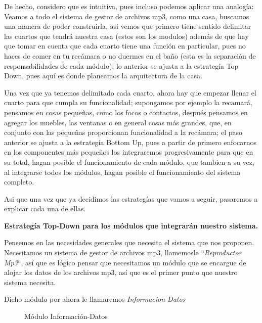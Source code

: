 \documentclass[10pt,letterpaper]{report}
\begin{document}
\noindent De hecho, considero que es intuitiva, pues incluso podemos aplicar una analogía: Veamos a todo el sistema de gestor de archivos mp3, como una casa, buscamos una manera de poder construirla, asi vemos que primero tiene sentido delimitar las cuartos que tendrá nuestra casa (estos son los modulos) además de que hay que tomar en cuenta que cada cuarto tiene una función en particular, pues no haces de comer en tu recámara o no duermes en el baño (esta es la separación de responsabilidades de cada módulo); lo anterior se ajusta a la estrategía Top Down, pues aquí es donde planeamos la arquitectura de la casa.

\noindent Una vez que ya tenemos delimitado cada cuarto, ahora hay que empezar llenar el cuarto para que cumpla su funcionalidad; supongamos por ejemplo la recamará, pensamos en cosas pequeñas, como los focos o contactos, después pensamos en agregar los muebles, las ventanas o en general cosas más grandes, que, en conjunto con las pequeñas proporcionan funcionalidad a la recámara; el paso anterior se ajusta a la estrategía Bottom Up, pues a partir de primero enfocarnos en los componentes más pequeños los integraremos progresivamente para que en su total, hagan posible el funcionamiento de cada módulo, que tambien a su vez, al integrarse todos los módulos, hagan posible el funcionamiento del sistema completo.


\vspace{0.5cm}

\noindent Asi que una vez que ya decidimos las estrategías que vamos a seguir, pasaremos a explicar cada una de ellas.

\vspace{0.5cm}

\noindent \textbf{Estrategía Top-Down para los módulos que integrarán nuestro sistema.}

\noindent Pensemos en las necesidades generales que necesita el sistema que nos proponen. Necesitamos un sistema de gestor de archivos mp3, llamemosle ``\textit{Reproductor Mp3}``, así que es lógico pensar que necesitamos un módulo que se encargue de alojar los datos de los archivos mp3, así que es el primer punto que nuestro sistema necesita.

\noindent Dicho módulo por ahora le llamaremos \textit{Informacion-Datos}

\begin{figure}[H]
\centering


\caption{Módulo Información-Datos}
\label{fig:informacion-datos}
\end{figure}
\end{document}
